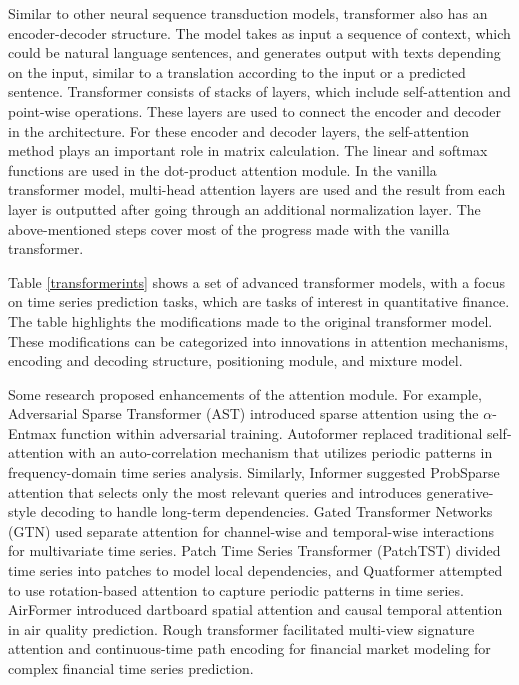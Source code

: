 \documentclass[preprint,12pt]{elsarticle}
\begin{document}
Similar to other neural sequence transduction models, transformer also has an encoder-decoder structure. The model takes as input a sequence of context, which could be natural language sentences, and generates output with texts depending on the input, similar to a translation according to the input or a predicted sentence. Transformer consists of stacks of layers, which include self-attention and point-wise operations. These layers are used to connect the encoder and decoder in the architecture. For these encoder and decoder layers, the self-attention method plays an important role in matrix calculation. The linear and softmax functions are used in the dot-product attention module. In the vanilla transformer model, multi-head attention layers are used and the result from each layer is outputted after going through an additional normalization layer. The above-mentioned steps cover most of the progress made with the vanilla transformer. 

Table \ref{transformerints} shows a set of advanced transformer models, with a focus on time series prediction tasks, which are tasks of interest in quantitative finance. The table highlights the modifications made to the original transformer model. These modifications can be categorized into innovations in attention mechanisms, encoding and decoding structure, positioning module, and mixture model.

Some research proposed enhancements of the attention module. For example, Adversarial Sparse Transformer (AST) \citep{wu2020adversarial} introduced sparse attention using the $\alpha$-Entmax function within adversarial training. Autoformer \citep{wu2021autoformer} replaced traditional self-attention with an auto-correlation mechanism that utilizes periodic patterns in frequency-domain time series analysis. Similarly, Informer \citep{zhou2021informer} suggested ProbSparse attention that selects only the most relevant queries and introduces generative-style decoding to handle long-term dependencies. Gated Transformer Networks (GTN) \citep{liu2021gated} used separate attention for channel-wise and temporal-wise interactions for multivariate time series.  Patch Time Series Transformer (PatchTST) \citep{nie2022PatchTST} divided time series into patches to model local dependencies, and Quatformer \citep{chen2022learning} attempted to use rotation-based attention to capture periodic patterns in time series. AirFormer \citep{liang2023airformer} introduced dartboard spatial attention and causal temporal attention in air quality prediction. Rough transformer \citep{morenopino2024rough} facilitated multi-view signature attention and continuous-time path encoding for financial market modeling for complex financial time series prediction.
\end{document}

